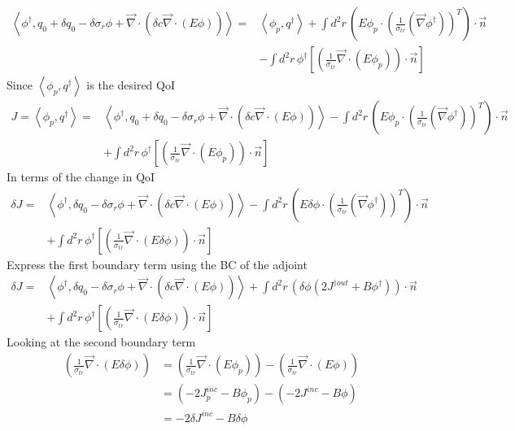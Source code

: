 \documentclass{article}
\newcommand{\bra}{\left\langle}
\newcommand{\ket}{\right\rangle}
\newcommand{\vdiv}{\vec{\nabla} \cdot}
\newcommand{\vgrad}{\vec{\nabla}}
\begin{document}
\begin{align*}
\bra \phi^\dag , q_0 + \delta q_0 - \delta \sigma_r \phi + \vdiv \left( \delta c \vdiv \left( E \phi \right) \right) \ket =& \bra \phi_p, q^\dag \ket + \int d^2 r \, \left( E \phi_p \cdot \left( \frac{1}{ \sigma_{tr}} \left(  \vgrad \phi^\dag \right) \right)^T \right) \cdot \vec{n} \\
&- \int d^2 r \, \phi^\dag \left[ \left( \frac{1}{\sigma_{tr}} \vdiv \left( E \phi_p \right) \right) \cdot \vec{n} \right]
\end{align*}
Since $\bra \phi_p, q^\dag \ket $ is the desired QoI
\begin{align*}
J = \bra \phi_p, q^\dag \ket =& \bra \phi^\dag , q_0 + \delta q_0 - \delta \sigma_r \phi + \vdiv \left( \delta c \vdiv \left( E \phi \right) \right)  \ket - \int d^2 r \, \left( E \phi_p \cdot \left( \frac{1}{ \sigma_{tr}} \left(  \vgrad \phi^\dag \right) \right)^T \right) \cdot \vec{n} \\
&+ \int d^2 r \, \phi^\dag \left[ \left( \frac{1}{\sigma_{tr}} \vdiv \left( E \phi_p \right) \right) \cdot \vec{n} \right]
\end{align*}
In terms of the change in QoI
\begin{align*}
\delta J =& \bra \phi^\dag , \delta q_0 - \delta \sigma_r \phi + \vdiv \left( \delta c \vdiv \left( E \phi \right) \right)  \ket - \int d^2 r \, \left( E \delta \phi \cdot \left( \frac{1}{ \sigma_{tr}} \left(  \vgrad \phi^\dag \right) \right)^T \right) \cdot \vec{n} \\
&+ \int d^2 r \, \phi^\dag \left[ \left( \frac{1}{\sigma_{tr}} \vdiv \left( E \delta \phi \right) \right) \cdot \vec{n} \right]
\end{align*}
Express the first boundary term using the BC of the adjoint
\begin{align*}
\delta J =& \bra \phi^\dag , \delta q_0 - \delta \sigma_r \phi + \vdiv \left( \delta c \vdiv \left( E \phi \right) \right)  \ket + \int d^2 r \, \left(\delta \phi \left( 2J^{ \dag out } + B \phi^\dag \right) \right) \cdot \vec{n} \\
&+ \int d^2 r \, \phi^\dag \left[ \left( \frac{1}{\sigma_{tr}} \vdiv \left( E \delta \phi \right) \right) \cdot \vec{n} \right]
\end{align*}
Looking at the second boundary term
\begin{align*}
\left( \frac{1}{\sigma_{tr}} \vdiv \left( E \delta \phi \right) \right) 
& = \left( \frac{1}{\sigma_{tr}} \vdiv \left( E \phi_p \right) \right) - \left( \frac{1}{\sigma_{tr}} \vdiv \left( E \phi \right) \right) \\
&= (-2J_p^{inc} - B \phi_p) - (-2J^{inc} - B \phi) \\
&= -2\delta J^{inc} -B \delta \phi
\end{align*}
\end{document}
